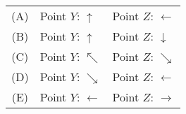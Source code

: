 \documentclass{../../oss-apphys-exam}
\begin{document}
\begin{multicols*}{2}
\begin{questions}
    \begin{tabular}{cll}
      (A) & Point $Y$: {\LARGE $\uparrow$} & Point $Z$: {\LARGE $\leftarrow$}\\
      (B) & Point $Y$: {\LARGE $\uparrow$} & Point $Z$: {\LARGE $\downarrow$}\\
      (C) & Point $Y$: {\LARGE $\nwarrow$} & Point $Z$: {\LARGE $\searrow$}\\
      (D) & Point $Y$: {\LARGE $\searrow$} & Point $Z$: {\LARGE $\leftarrow$}\\
      (E) & Point $Y$: {\LARGE $\leftarrow$}&Point $Z$: {\LARGE $\rightarrow$}\\
    \end{tabular}
    \vspace{.7in}
    

    
    \columnbreak
    
    

\end{questions}
\end{multicols*}
\end{document}
